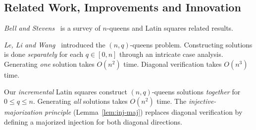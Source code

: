 \documentclass[10pt,a4paper]{article}
\theoremstyle{remark}
\begin{document}
\begin{abstract}
\vspace{4pt}

\noindent All results (including $n \in \{8, 9, 15, 21\}$ and $n \in \{4, 6\}$) are formalized in
Lean~4~\cite{CompanionRepo,PalomarLean}.

\vspace{8pt}

\noindent Repositories, Mathoverflow and Puzzling (where \emph{coins} instead of \emph{queens}
terminology is used):
\begin{itemize}
\item Companion repo~\cite{CompanionRepo}: 
{\scriptsize\url{https://github.com/NofanTasi/incremental-nc-coins-problem}},
\item Palomar Lean~4 repo~\cite{PalomarLean}:
{\scriptsize\url{https://github.com/LucDuponcheelAtGitHub/incremental-nc-coins}}.
\item \href{https://mathoverflow.net/questions/510135}{MO \#510135}~\cite{MO510135}, 
\item \href{https://puzzling.stackexchange.com/questions/138939}{PSE \#138939}~\cite{PSE138939},
\item \href{https://mathoverflow.net/questions/516225}{MO \#516225}~\cite{MO516225}.
\end{itemize}

\end{abstract}

\newpage

\subsection{Related Work, Improvements and Innovation}\label{sec:related}

\emph{Bell and Stevens}~\cite{BS2009} is a survey of $n$-queens and Latin squares related
results.

\emph{Le, Li and Wang~\cite{LLW1990}} introduced the $(n,q)$-queens problem. Constructing
solutions is done \emph{separately} for each $q \in [0,n]$ through an intricate case analysis. 
Generating \emph{one} solution takes $O(n^2)$ time. Diagonal verification takes $O(n^3)$ time.

Our \emph{incremental} Latin squares construct $(n,q)$-queens solutions \emph{together} for
$0 \le q \le n$. Generating \emph{all} solutions takes $O(n^2)$ time. The
\emph{injective-majorization principle} (Lemma~\ref{lem:inj-maj}) replaces diagonal verification
by defining a majorized injection for both diagonal directions.
\end{document}

